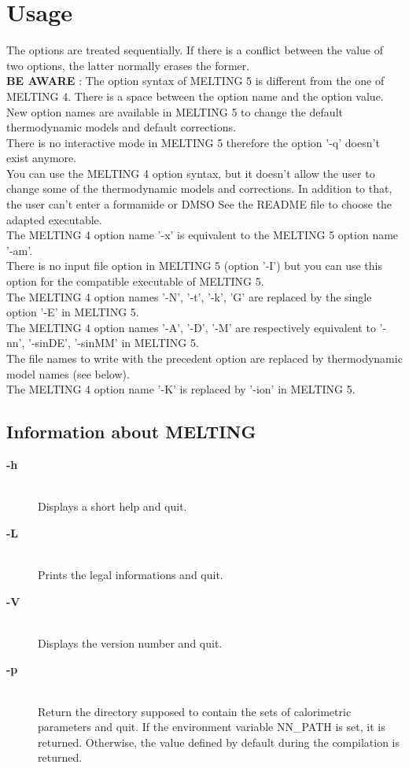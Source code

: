 \documentclass{article}
\begin{document}
\section{Usage}

The options are treated sequentially. If there is a conflict between the value
of two options, the latter normally erases the former.\\

\textbf{BE AWARE} : The option syntax of MELTING 5 is different from the one of MELTING 4. There
is a space between the option name and the option value. New option names are available
in MELTING 5 to change the default thermodynamic models and default corrections.\\
There is no interactive mode in MELTING 5 therefore the option '-q' doesn't exist anymore.\\
You can use the MELTING 4 option syntax, but it doesn't allow the user to change some of 
the thermodynamic models and corrections. In addition to that, the user can't enter a formamide or DMSO %
See the README file to choose the adapted executable.\\
The MELTING 4 option name '-x' is equivalent to the MELTING 5 option name '-am'. \\
There is no input file option in MELTING 5 (option '-I') but you can use this option for the compatible executable
of MELTING 5.\\
The MELTING 4 option names '-N', '-t', '-k', 'G' are replaced by the single option '-E' in MELTING 5. \\
The MELTING 4 option names '-A', '-D', '-M' are respectively equivalent to '-nn', '-sinDE', '-sinMM' in MELTING 5. \\
The file names to write with the precedent option are replaced by thermodynamic model names (see below). \\
The MELTING 4 option name '-K' is replaced by '-ion' in MELTING 5. \\

\subsection{Information about MELTING}
\begin{description}

\item [\textbf{-h}]\mbox{}\\ 
  Displays a short help and quit.
\item [\textbf{-L}]\mbox{}\\ 
  Prints the legal informations and quit. 
\item [\textbf{-V}  ]\mbox{}\\ 
  Displays the version number and quit.  
\item [\textbf{-p}]\mbox{}\\ 
  Return the directory supposed to contain the sets of calorimetric parameters and quit. 
  If the environment variable NN\_PATH is set, it is returned. Otherwise, the value
  defined by default during the compilation is returned.
\end{description}
\end{document}
